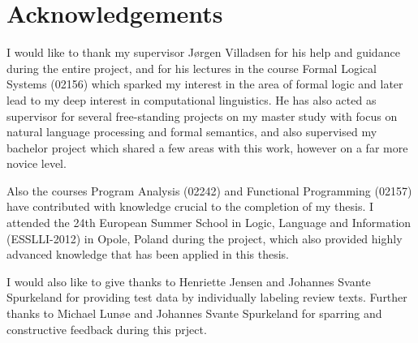 
\chapter{Acknowledgements}

I would like to thank my supervisor Jørgen Villadsen for his help and guidance during the entire project, and for his lectures in the course Formal Logical Systems (02156) which sparked my interest in the area of formal logic and later lead to my deep interest in computational linguistics. He has also acted as supervisor for several free-standing projects on my master study with focus on natural language processing and formal semantics, and also supervised my bachelor project which shared a few areas with this work, however on a far more novice level. 

Also the courses Program Analysis (02242) and Functional Programming (02157) have contributed with knowledge crucial to the completion of my thesis. I attended the 24th European Summer School in Logic, Language and Information (ESSLLI-2012) in Opole, Poland during the project, which also provided highly advanced knowledge that has been applied in this thesis.

I would also like to give thanks to Henriette Jensen and Johannes Svante Spurkeland for providing test data by individually labeling review texts. Further thanks to Michael Lunøe and Johannes Svante Spurkeland for sparring and constructive feedback during this prject.

